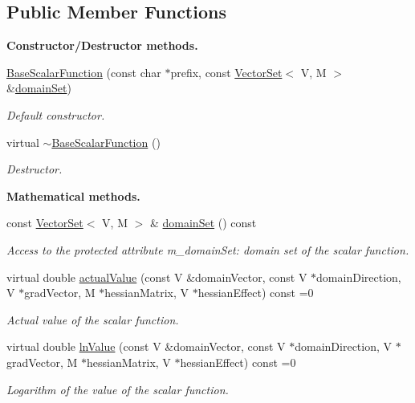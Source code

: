 \subsection*{Public Member Functions}
\begin{Indent}{\bf Constructor/\-Destructor methods.}\par
\begin{DoxyCompactItemize}
\item 
\hyperlink{class_q_u_e_s_o_1_1_base_scalar_function_a68ab7c82be7eba7bd5d51ce8d85c65f0}{Base\-Scalar\-Function} (const char $\ast$prefix, const \hyperlink{class_q_u_e_s_o_1_1_vector_set}{Vector\-Set}$<$ V, M $>$ \&\hyperlink{class_q_u_e_s_o_1_1_base_scalar_function_ad0937628825249dd36ded3ce0c7959ac}{domain\-Set})
\begin{DoxyCompactList}\small\item\em Default constructor. \end{DoxyCompactList}\item 
virtual \hyperlink{class_q_u_e_s_o_1_1_base_scalar_function_a6f96de783e174cfe84682766f5957969}{$\sim$\-Base\-Scalar\-Function} ()
\begin{DoxyCompactList}\small\item\em Destructor. \end{DoxyCompactList}\end{DoxyCompactItemize}
\end{Indent}
\begin{Indent}{\bf Mathematical methods.}\par
\begin{DoxyCompactItemize}
\item 
const \hyperlink{class_q_u_e_s_o_1_1_vector_set}{Vector\-Set}$<$ V, M $>$ \& \hyperlink{class_q_u_e_s_o_1_1_base_scalar_function_ad0937628825249dd36ded3ce0c7959ac}{domain\-Set} () const 
\begin{DoxyCompactList}\small\item\em Access to the protected attribute {\ttfamily m\-\_\-domain\-Set\-:} domain set of the scalar function. \end{DoxyCompactList}\item 
virtual double \hyperlink{class_q_u_e_s_o_1_1_base_scalar_function_aad8957ecbc4e155cbc4c40a1c21135d7}{actual\-Value} (const V \&domain\-Vector, const V $\ast$domain\-Direction, V $\ast$grad\-Vector, M $\ast$hessian\-Matrix, V $\ast$hessian\-Effect) const =0
\begin{DoxyCompactList}\small\item\em Actual value of the scalar function. \end{DoxyCompactList}\item 
virtual double \hyperlink{class_q_u_e_s_o_1_1_base_scalar_function_acf2f92adac2df2a0d750dc62cd3a4d0a}{ln\-Value} (const V \&domain\-Vector, const V $\ast$domain\-Direction, V $\ast$grad\-Vector, M $\ast$hessian\-Matrix, V $\ast$hessian\-Effect) const =0
\begin{DoxyCompactList}\small\item\em Logarithm of the value of the scalar function. \end{DoxyCompactList}\end{DoxyCompactItemize}
\end{Indent}
